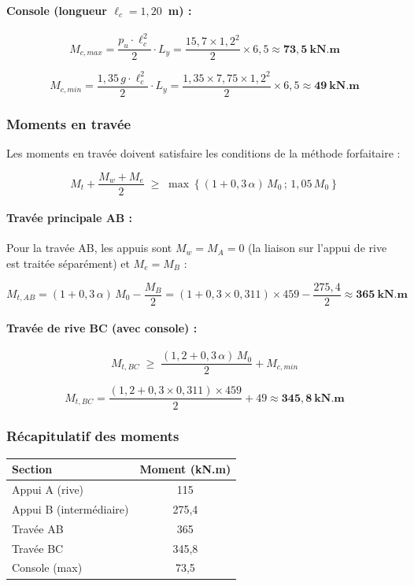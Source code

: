 \paragraph{Console (longueur $\ell_c = 1{,}20$~m) :}
\[
M_{c,max} = \frac{p_u \cdot \ell_c^2}{2} \cdot L_y = \frac{15{,}7 \times 1{,}2^2}{2} \times 6{,}5 \approx \mathbf{73{,}5~\text{kN.m}}
\]

\[
M_{c,min} = \frac{1{,}35 \, g \cdot \ell_c^2}{2} \cdot L_y = \frac{1{,}35 \times 7{,}75 \times 1{,}2^2}{2} \times 6{,}5 \approx \mathbf{49~\text{kN.m}}
\]

\subsubsection{Moments en travée}

Les moments en travée doivent satisfaire les conditions de la méthode forfaitaire :

\[
M_t + \frac{M_w + M_e}{2} \;\geq\; \max\!\left\{(1 + 0{,}3\,\alpha) \, M_0 \,;\, 1{,}05 \, M_0\right\}
\]

\paragraph{Travée principale AB :}

Pour la travée AB, les appuis sont $M_w = M_A = 0$ (la liaison sur l'appui de rive est traitée séparément) et $M_e = M_B$ :

\[
M_{t,AB} = (1 + 0{,}3 \, \alpha) \, M_0 - \frac{M_B}{2} = (1 + 0{,}3 \times 0{,}311) \times 459 - \frac{275{,}4}{2} \approx \mathbf{365~\text{kN.m}}
\]

\paragraph{Travée de rive BC (avec console) :}

\[
M_{t,BC} \;\geq\; \frac{(1{,}2 + 0{,}3\,\alpha) \, M_0}{2} + M_{c,min}
\]

\[
M_{t,BC} = \frac{(1{,}2 + 0{,}3 \times 0{,}311) \times 459}{2} + 49 \approx \mathbf{345{,}8~\text{kN.m}}
\]

\subsubsection{Récapitulatif des moments}

\begin{center}
\begin{tabularx}{0.65\linewidth}{Xc}
\toprule
\textbf{Section} & \textbf{Moment (kN.m)} \\
\midrule
Appui A (rive)            & 115     \\
Appui B (intermédiaire)   & 275{,}4 \\
Travée AB                 & 365     \\
Travée BC                 & 345{,}8 \\
Console (max)             & 73{,}5  \\
\bottomrule
\end{tabularx}
\end{center}


